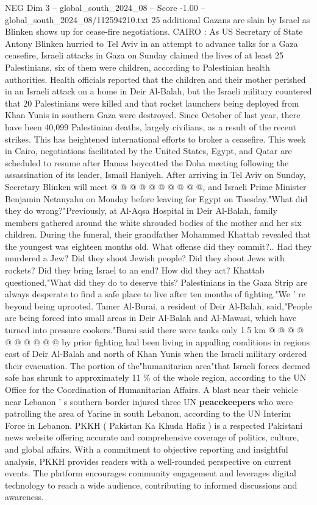 \begin{textsample}{NEG Dim 3 – global\_south\_2024\_08 – Score -1.00 – global\_south\_2024\_08/112594210.txt}  \label{ex:f3_neg_121}
25 additional Gazans are slain by Israel as Blinken shows up for cease-fire negotiations.
CAIRO : As US Secretary of State Antony Blinken hurried to Tel Aviv in an attempt to advance talks for a Gaza ceasefire, Israeli attacks in Gaza on Sunday claimed the lives of at least 25 Palestinians, six of them were children, according to Palestinian health authorities.
Health officials reported that the children and their mother perished in an Israeli attack on a home in Deir Al-Balah, but the Israeli military countered that 20 Palestinians were killed and that rocket launchers being deployed from Khan Yunis in southern Gaza were destroyed.
Since October of last year, there have been 40,099 Palestinian deaths, largely civilians, as a result of the recent strikes.
This has heightened international efforts to broker a ceasefire.
This week in Cairo, negotiations facilitated by the United States, Egypt, and Qatar are scheduled to resume after Hamas boycotted the Doha meeting following the assassination of its leader, Ismail Haniyeh.
After arriving in Tel Aviv on Sunday, Secretary Blinken will meet @ @ @ @ @ @ @ @ @ @, and Israeli Prime Minister Benjamin Netanyahu on Monday before leaving for Egypt on Tuesday."What did they do wrong?"Previously, at Al-Aqsa Hospital in Deir Al-Balah, family members gathered around the white shrouded bodies of the mother and her six children.
During the funeral, their grandfather Mohammed Khattab revealed that the youngest was eighteen months old.
What offense did they commit?..
Had they murdered a Jew?
Did they shoot Jewish people?
Did they shoot Jews with rockets?
Did they bring Israel to an end?
How did they act?
Khattab questioned,"What did they do to deserve this?
Palestinians in the Gaza Strip are always desperate to find a safe place to live after ten months of fighting."We ' re beyond being uprooted.
Tamer Al-Burai, a resident of Deir Al-Balah, said,"People are being forced into small areas in Deir Al-Balah and Al-Mawasi, which have turned into pressure cookers."Burai said there were tanks only 1.5 km @ @ @ @ @ @ @ @ @ @ by prior fighting had been living in appalling conditions in regions east of Deir Al-Balah and north of Khan Yunis when the Israeli military ordered their evacuation.
The portion of the"humanitarian area"that Israeli forces deemed safe has shrunk to approximately 11 \% of the whole region, according to the UN Office for the Coordination of Humanitarian Affairs.
A blast near their vehicle near Lebanon ' s southern border injured three UN \textbf{peacekeepers} who were patrolling the area of Yarine in south Lebanon, according to the UN Interim Force in Lebanon.
PKKH ( Pakistan Ka Khuda Hafiz ) is a respected Pakistani news website offering accurate and comprehensive coverage of politics, culture, and global affairs.
With a commitment to objective reporting and insightful analysis, PKKH provides readers with a well-rounded perspective on current events.
The platform encourages community engagement and leverages digital technology to reach a wide audience, contributing to informed discussions and awareness.

\end{textsample}
